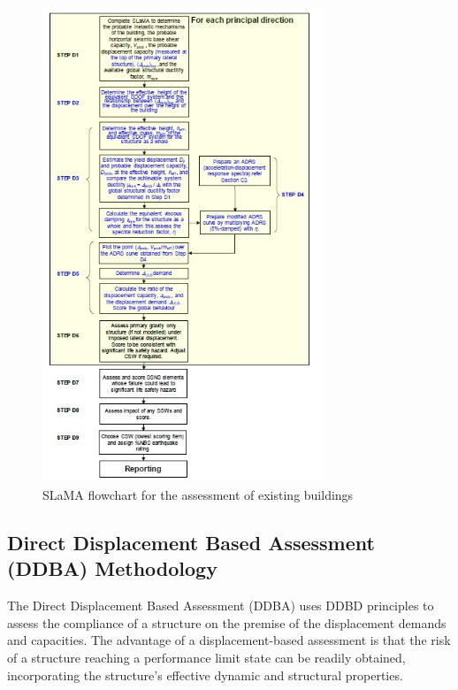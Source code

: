 \begin{figure}[htbp]
	\centering
	\includegraphics[width=0.75\textwidth]{VAC Thesis 2.0/Chapter-6/figs/SLaMA_methodology.jpg}
	\caption{SLaMA flowchart for the assessment of existing buildings}
	\label{fig:slama_CH6}
\end{figure}

\subsection{Direct Displacement Based Assessment (DDBA) Methodology}

The Direct Displacement Based Assessment (DDBA) uses DDBD principles to assess the compliance of a structure on the premise of the displacement demands and capacities. The advantage of a displacement-based assessment is that the risk of a structure reaching a performance limit state can be readily obtained, incorporating the structure's effective dynamic and structural properties. 

